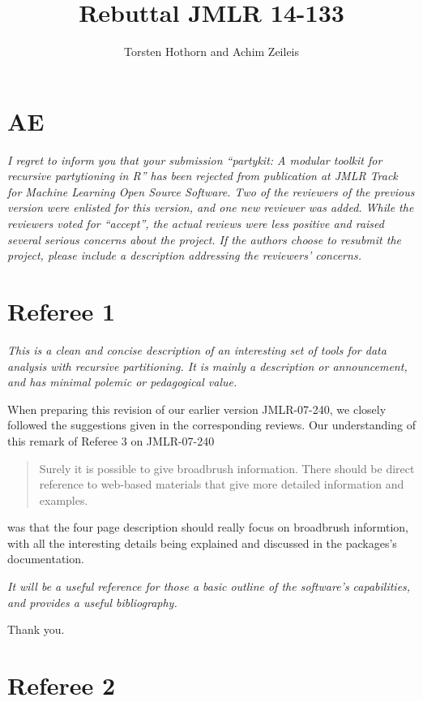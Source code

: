 \documentclass{article}
\title{Rebuttal JMLR 14-133}
\author{Torsten Hothorn and Achim Zeileis}
\begin{document}
\maketitle

\section*{AE}

\textit{
I regret to inform you that your submission ``partykit: A modular toolkit
for recursive partytioning in R'' has been rejected from publication at JMLR
Track for Machine Learning Open Source Software.  Two of the reviewers of
the previous version were enlisted for this version, and one new reviewer
was added.  While the reviewers voted for ``accept'', the actual reviews
were less positive and raised several serious concerns about the project. 
If the authors choose to resubmit the project, please include a description
addressing the reviewers' concerns.}

\section*{Referee 1}

\textit{
This is a clean and concise description of an interesting set of tools for
data analysis with recursive partitioning.  It is mainly a description or
announcement, and has minimal polemic or pedagogical value.}

When preparing this revision of our earlier version JMLR-07-240, we closely
followed the suggestions given in the corresponding reviews. Our
understanding of this remark of Referee 3 on JMLR-07-240
\begin{quote} 
Surely it is possible to give broadbrush information. There should be direct
reference to web-based
materials that give more detailed information and examples.
\end{quote}
was that the four page description should really focus on 
broadbrush informtion, with all the interesting details being explained and
discussed in the packages's documentation.

\textit{It will be a
useful reference for those a basic outline of the software's capabilities,
and provides a useful bibliography.}

Thank you.

\section*{Referee 2}
\end{document}
